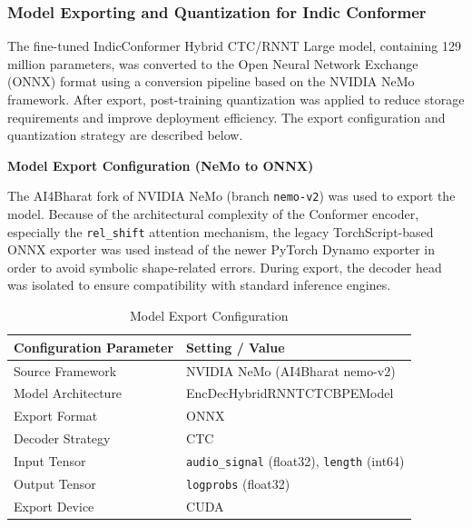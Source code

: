




\subsubsection{Model Exporting and Quantization for Indic Conformer}

The fine-tuned IndicConformer Hybrid CTC/RNNT Large model, containing 129 million parameters, was converted to the Open Neural Network Exchange (ONNX) format using a conversion pipeline based on the NVIDIA NeMo framework. After export, post-training quantization was applied to reduce storage requirements and improve deployment efficiency. The export configuration and quantization strategy are described below.

\textbf{Model Export Configuration (NeMo to ONNX)}

The AI4Bharat fork of NVIDIA NeMo (branch \texttt{nemo-v2}) was used to export the model. Because of the architectural complexity of the Conformer encoder, especially the \texttt{rel\_shift} attention mechanism, the legacy TorchScript-based ONNX exporter was used instead of the newer PyTorch Dynamo exporter in order to avoid symbolic shape-related errors. During export, the decoder head was isolated to ensure compatibility with standard inference engines.

\begin{table}[H]
\caption{Model Export Configuration}
\centering
\begin{tabular}{|l|l|}
\hline
\textbf{Configuration Parameter} & \textbf{Setting / Value} \\
\hline
Source Framework & NVIDIA NeMo (AI4Bharat nemo-v2) \\
Model Architecture & EncDecHybridRNNTCTCBPEModel \\
Export Format & ONNX  \\
Decoder Strategy & CTC \\
Input Tensor & \texttt{audio\_signal} (float32), \texttt{length} (int64) \\
Output Tensor & \texttt{logprobs} (float32) \\
Export Device & CUDA \\
\hline
\end{tabular}
\end{table}

